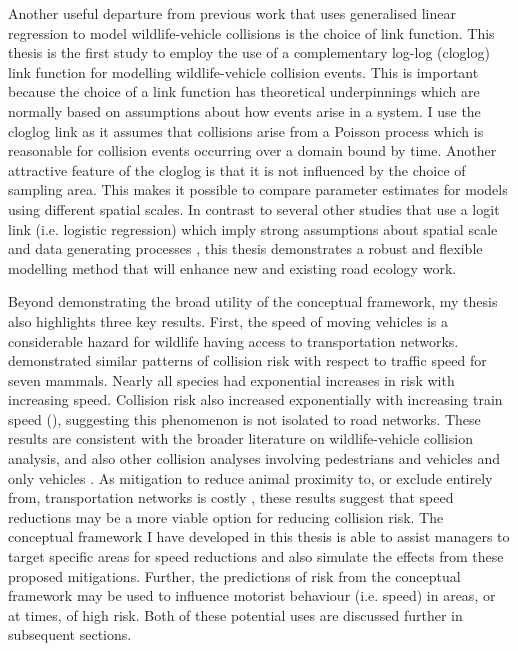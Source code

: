 Another useful departure from previous work that uses generalised linear regression to model wildlife-vehicle collisions is the choice of link function. This thesis is the first study to employ the use of a complementary log-log (cloglog) link function for modelling wildlife-vehicle collision events. This is important because the choice of a link function has theoretical underpinnings which are normally based on assumptions about how events arise in a system. I use the cloglog link as it assumes that collisions arise from a Poisson process which is reasonable for collision events occurring over a domain bound by time. Another attractive feature of the cloglog is that it is not influenced by the choice of sampling area. This makes it possible to compare parameter estimates for models using different spatial scales.  In contrast to several other studies that use a logit link (i.e. logistic regression) which imply strong assumptions about spatial scale and data generating processes \citep[e.g.][]{seo15,gund98}, this thesis demonstrates a robust and flexible modelling method that will enhance new and existing road ecology work.

Beyond demonstrating the broad utility of the conceptual framework, my thesis also highlights three key results. First, the speed of moving vehicles is a considerable hazard for wildlife having access to transportation networks.  demonstrated similar patterns of collision risk with respect to traffic speed for seven mammals. Nearly all species had exponential increases in risk with increasing speed. Collision risk also increased exponentially with increasing train speed (), suggesting this phenomenon is not isolated to road networks. These results are consistent with the broader literature on wildlife-vehicle collision analysis, and also other collision analyses involving pedestrians and vehicles \citep{rosen09} and only vehicles \citep{liu97}. As mitigation to reduce animal proximity to, or exclude entirely from, transportation networks is costly \citep{huij09}, these results suggest that speed reductions may be a more viable option for reducing collision risk. The conceptual framework I have developed in this thesis is able to assist managers to target specific areas for speed reductions and also simulate the effects from these proposed mitigations. Further, the predictions of risk from the conceptual framework may be used to influence motorist behaviour (i.e. speed) in areas, or at times, of high risk. Both of these potential uses are discussed further in subsequent sections.

